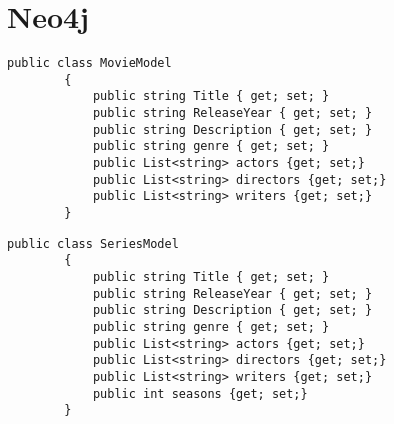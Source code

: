 \section{Neo4j}

\begin{tcolorbox}
    \lstset{style=sharpstyle}
    \begin{lstlisting}[language={[Sharp]C}, caption={Logs HBASE Model}, label={lst:log}]
        public class MovieModel
        {
            public string Title { get; set; }
            public string ReleaseYear { get; set; }
            public string Description { get; set; }
            public string genre { get; set; }
            public List<string> actors {get; set;}
            public List<string> directors {get; set;}
            public List<string> writers {get; set;}
        }
    \end{lstlisting}
\end{tcolorbox}

\begin{tcolorbox}
    \lstset{style=sharpstyle}
    \begin{lstlisting}[language={[Sharp]C}, caption={Logs HBASE Model}, label={lst:log}]
        public class SeriesModel
        {
            public string Title { get; set; }
            public string ReleaseYear { get; set; }
            public string Description { get; set; }
            public string genre { get; set; }
            public List<string> actors {get; set;}
            public List<string> directors {get; set;}
            public List<string> writers {get; set;}
            public int seasons {get; set;}
        }
    \end{lstlisting}
\end{tcolorbox}